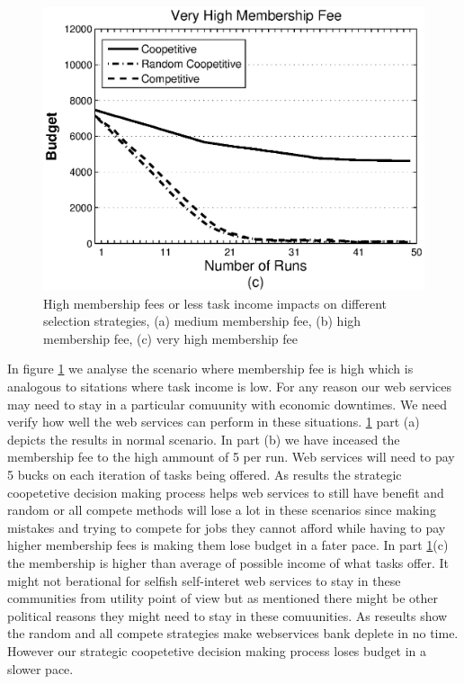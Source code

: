 \documentclass[runningheads,a4paper]{llncs}
\begin{document}
\begin{figure}
\includegraphics[scale=0.275]{graphbgtveryhigh.eps}
\caption{High membership fees or less task income impacts on different selection strategies, (a) medium membership fee, (b) high membership fee, (c) very high membership fee} \label{membership_fee_graph}
\end{figure}

In figure \ref{membership_fee_graph} we analyse the scenario where membership fee is high which is analogous to sitations where task income is low. For any reason our web services may need to stay in a particular comuunity with economic downtimes. We need verify how well the web services can perform in these situations. \ref{membership_fee_graph} part (a) depicts the results in normal scenario. In part (b) we have inceased the membership fee to the high ammount of 5 per run. Web services will need to pay 5 bucks on each iteration of tasks being offered. As results the strategic coopetetive decision making process helps web services to still have benefit and random or all compete methods will lose a lot in these scenarios since making mistakes and trying to compete for jobs they cannot afford while having to pay higher membership fees is making them lose budget in a fater pace. In part \ref{membership_fee_graph}(c) the membership is higher than average of possible income of what tasks offer. It might not berational for selfish self-interet web services to stay in these communities from utility point of view but as mentioned there might be other political reasons they might need to stay in these comuunities. As reseults show the random and all compete strategies make webservices bank deplete in no time. However our strategic coopetetive decision making process loses budget in a slower pace.
\end{document}
